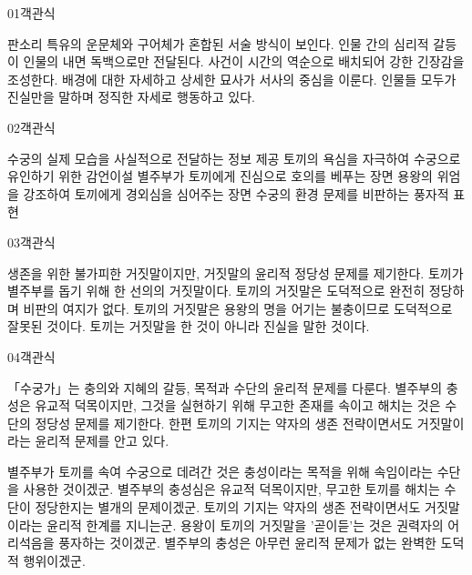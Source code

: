 \documentclass[fs85,seriesWit]{korfarm-base}
\begin{document}
\kfBeginMC
\begin{kfQBlock}{01}{객관식}
\begin{kfChoices}
\kfChoice 판소리 특유의 운문체와 구어체가 혼합된 서술 방식이 보인다.
\kfChoice 인물 간의 심리적 갈등이 인물의 내면 독백으로만 전달된다.
\kfChoice 사건이 시간의 역순으로 배치되어 강한 긴장감을 조성한다.
\kfChoice 배경에 대한 자세하고 상세한 묘사가 서사의 중심을 이룬다.
\kfChoice 인물들 모두가 진실만을 말하며 정직한 자세로 행동하고 있다.
\end{kfChoices}
\end{kfQBlock}

\begin{kfQBlock}{02}{객관식}
\begin{kfChoices}
\kfChoice 수궁의 실제 모습을 사실적으로 전달하는 정보 제공
\kfChoice 토끼의 욕심을 자극하여 수궁으로 유인하기 위한 감언이설
\kfChoice 별주부가 토끼에게 진심으로 호의를 베푸는 장면
\kfChoice 용왕의 위엄을 강조하여 토끼에게 경외심을 심어주는 장면
\kfChoice 수궁의 환경 문제를 비판하는 풍자적 표현
\end{kfChoices}
\end{kfQBlock}

\begin{kfQBlock}{03}{객관식}
\begin{kfChoices}
\kfChoice 생존을 위한 불가피한 거짓말이지만, 거짓말의 윤리적 정당성 문제를 제기한다.
\kfChoice 토끼가 별주부를 돕기 위해 한 선의의 거짓말이다.
\kfChoice 토끼의 거짓말은 도덕적으로 완전히 정당하며 비판의 여지가 없다.
\kfChoice 토끼의 거짓말은 용왕의 명을 어기는 불충이므로 도덕적으로 잘못된 것이다.
\kfChoice 토끼는 거짓말을 한 것이 아니라 진실을 말한 것이다.
\end{kfChoices}
\end{kfQBlock}

\begin{kfQBlock}{04}{객관식}
\begin{kfEvidence}「수궁가」는 충의와 지혜의 갈등, 목적과 수단의 윤리적 문제를 다룬다. 별주부의 충성은 유교적 덕목이지만, 그것을 실현하기 위해 무고한 존재를 속이고 해치는 것은 수단의 정당성 문제를 제기한다. 한편 토끼의 기지는 약자의 생존 전략이면서도 거짓말이라는 윤리적 문제를 안고 있다.\end{kfEvidence}
\begin{kfChoices}
\kfChoice 별주부가 토끼를 속여 수궁으로 데려간 것은 충성이라는 목적을 위해 속임이라는 수단을 사용한 것이겠군.
\kfChoice 별주부의 충성심은 유교적 덕목이지만, 무고한 토끼를 해치는 수단이 정당한지는 별개의 문제이겠군.
\kfChoice 토끼의 기지는 약자의 생존 전략이면서도 거짓말이라는 윤리적 한계를 지니는군.
\kfChoice 용왕이 토끼의 거짓말을 '곧이듣'는 것은 권력자의 어리석음을 풍자하는 것이겠군.
\kfChoice 별주부의 충성은 아무런 윤리적 문제가 없는 완벽한 도덕적 행위이겠군.
\end{kfChoices}
\end{kfQBlock}
\end{document}
